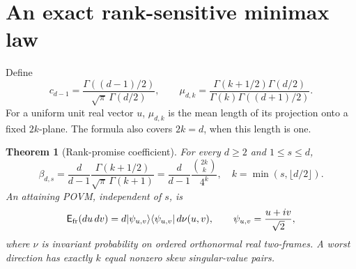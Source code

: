 \documentclass[11pt]{article}
\newtheorem{theorem}{Theorem}
\newcommand{\E}{\mathsf E}
\begin{document}
\section{An exact rank-sensitive minimax law}
Define
\[
c_{d-1}=\frac{\Gamma((d-1)/2)}{\sqrt\pi\,\Gamma(d/2)},\qquad
\mu_{d,k}=\frac{\Gamma(k+1/2)\Gamma(d/2)}
{\Gamma(k)\Gamma((d+1)/2)}.
\]
For a uniform unit real vector $u$, $\mu_{d,k}$ is the mean length of
its projection onto a fixed $2k$-plane. The formula also covers
$2k=d$, when this length is one.

\begin{theorem}[Rank-promise coefficient]
For every $d\geq2$ and $1\leq s\leq d$,
\begin{equation}
\boxed{\quad
\beta_{d,s}=\frac{d}{d-1}
\frac{\Gamma(k+1/2)}{\sqrt\pi\,\Gamma(k+1)}
=\frac{d}{d-1}\frac{\binom{2k}{k}}{4^k},
\quad k=\min(s,\lfloor d/2\rfloor).
\quad}
\label{eq:ranklaw}
\end{equation}
An attaining POVM, independent of $s$, is
\[
\E_{\rm fr}(du\,dv)=d|\psi_{u,v}\rangle\langle\psi_{u,v}|\,d\nu(u,v),
\qquad \psi_{u,v}=\frac{u+iv}{\sqrt2},
\]
where $\nu$ is invariant probability on ordered orthonormal real
two-frames. A worst direction has exactly $k$ equal nonzero skew
singular-value pairs.
\end{theorem}
\end{document}
